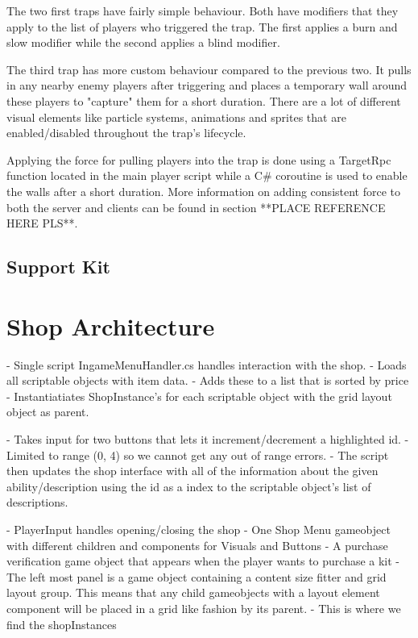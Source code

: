 The two first traps have fairly simple behaviour. Both have modifiers that they apply to the list of players who triggered the trap. The first applies a burn and slow modifier while the second applies a blind modifier. 

The third trap has more custom behaviour compared to the previous two. It pulls in any nearby enemy players after triggering and places a temporary wall around these players to "capture" them for a short duration. There are a lot of different visual elements like particle systems, animations and sprites that are enabled/disabled throughout the trap's lifecycle. 

Applying the force for pulling players into the trap is done using a TargetRpc function located in the main player script while a C\# coroutine is used to enable the walls after a short duration. More information on adding consistent force to both the server and clients can be found in section **PLACE REFERENCE HERE PLS**. 

\subsection{Support Kit}

\section{Shop Architecture}
- Single script IngameMenuHandler.cs handles interaction with the shop.
        - Loads all scriptable objects with item data. 
        - Adds these to a list that is sorted by price
        - Instantiatiates ShopInstance's for each scriptable object with the grid layout object as parent. 
        
        - Takes input for two buttons that lets it increment/decrement a highlighted id.
            - Limited to range (0, 4) so we cannot get any out of range errors.
        - The script then updates the shop interface with all of the information about the given ability/description using the id as a index to the scriptable object's list of descriptions.  

- PlayerInput handles opening/closing the shop
- One Shop Menu gameobject with different children and components for Visuals and Buttons
        - A purchase verification game object that appears when the player wants to purchase a kit
        - The left most panel is a game object containing a content size fitter and grid layout group. This means that any child gameobjects with a layout element component will be placed in a grid like fashion by its parent.
            - This is where we find the shopInstances
            
